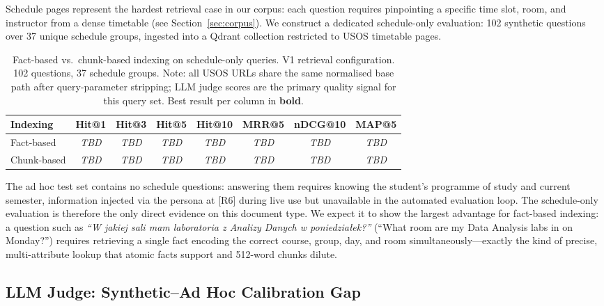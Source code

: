 \documentclass[sigconf,natbib=true]{acmart}
\begin{document}
Schedule pages represent the hardest retrieval case in our corpus: each question requires pinpointing a specific time slot, room, and instructor from a dense timetable (see Section~\ref{sec:corpus}).
We construct a dedicated schedule-only evaluation: 102 synthetic questions over 37 unique schedule groups, ingested into a Qdrant collection restricted to USOS timetable pages.

\begin{table}[t]
\centering
\caption{Fact-based vs.\ chunk-based indexing on schedule-only queries. V1 retrieval configuration. 102 questions, 37 schedule groups. Note: all USOS URLs share the same normalised base path after query-parameter stripping; LLM judge scores are the primary quality signal for this query set. Best result per column in \textbf{bold}.}
\label{tab:schedule_eval}
\setlength{\tabcolsep}{4pt}
\small
\begin{tabular}{lccccccc}
\toprule
\textbf{Indexing}
  & \textbf{Hit@1} & \textbf{Hit@3} & \textbf{Hit@5} & \textbf{Hit@10}
  & \textbf{MRR@5} & \textbf{nDCG@10} & \textbf{MAP@5} \\
\midrule
Fact-based  & \textit{TBD} & \textit{TBD} & \textit{TBD} & \textit{TBD} & \textit{TBD} & \textit{TBD} & \textit{TBD} \\
Chunk-based & \textit{TBD} & \textit{TBD} & \textit{TBD} & \textit{TBD} & \textit{TBD} & \textit{TBD} & \textit{TBD} \\
\bottomrule
\end{tabular}
\end{table}

The ad hoc test set contains no schedule questions: answering them requires knowing the student's programme of study and current semester, information injected via the persona at [R6] during live use but unavailable in the automated evaluation loop.
The schedule-only evaluation is therefore the only direct evidence on this document type.
We expect it to show the largest advantage for fact-based indexing: a question such as \textit{``W jakiej sali mam laboratoria z Analizy Danych w poniedziałek?''} (``What room are my Data Analysis labs in on Monday?'') requires retrieving a single fact encoding the correct course, group, day, and room simultaneously---exactly the kind of precise, multi-attribute lookup that atomic facts support and 512-word chunks dilute.

\subsection{LLM Judge: Synthetic--Ad Hoc Calibration Gap}
\end{document}
